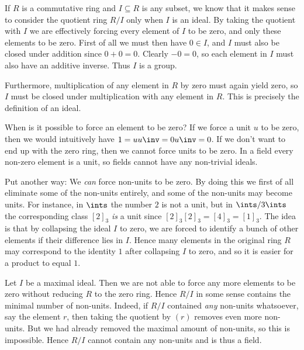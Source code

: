 \documentclass[article, a4paper, 11pt, oneside]{memoir}
\numberwithin{equation}{chapter}
\theoremstyle{nonumberplain}
\begin{document}
\begin{remarkbreak}
    If $R$ is a commutative ring and $I \subseteq R$ is any subset, we know that it makes sense to consider the quotient ring $R/I$ only when $I$ is an ideal. By taking the quotient with $I$ we are effectively forcing every element of $I$ to be zero, and only these elements to be zero. First of all we must then have $0 \in I$, and $I$ must also be closed under addition since $0 + 0 = 0$. Clearly $-0 = 0$, so each element in $I$ must also have an additive inverse. Thus $I$ is a group.

    Furthermore, multiplication of any element in $R$ by zero must again yield zero, so $I$ must be closed under multiplication with any element in $R$. This is precisely the definition of an ideal.

    When is it possible to force an element to be zero? If we force a unit $u$ to be zero, then we would intuitively have $1 = u u\inv = 0 u\inv = 0$. If we don't want to end up with the zero ring, then we cannot force units to be zero. In a field every non-zero element is a unit, so fields cannot have any non-trivial ideals.

    Put another way: We \emph{can} force non-units to be zero. By doing this we first of all eliminate some of the non-units entirely, and some of the non-units may become units. For instance, in $\ints$ the number $2$ is not a unit, but in $\ints/3\ints$ the corresponding class $[2]_3$ \emph{is} a unit since $[2]_3 [2]_3 = [4]_3 = [1]_3$. The idea is that by collapsing the ideal $I$ to zero, we are forced to identify a bunch of other elements if their difference lies in $I$. Hence many elements in the original ring $R$ may correspond to the identity $1$ after collapsing $I$ to zero, and so it is easier for a product to equal $1$.

    Let $I$ be a maximal ideal. Then we are not able to force any more elements to be zero without reducing $R$ to the zero ring. Hence $R/I$ in some sense contains the minimal number of non-units. Indeed, if $R/I$ contained \emph{any} non-units whatsoever, say the element $r$, then taking the quotient by $(r)$ removes even more non-units. But we had already removed the maximal amount of non-units, so this is impossible. Hence $R/I$ cannot contain any non-units and is thus a field.
\end{remarkbreak}
\end{document}

